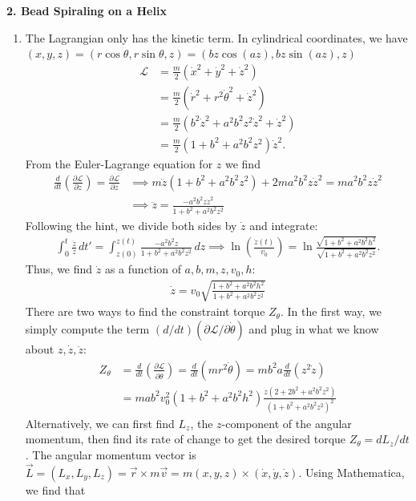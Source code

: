 \documentclass{article}
\theoremstyle{definition}
\newcommand{\p}{\partial}
\newcommand{\lag}{\mathcal{L}}
\newcommand{\f}[2]{\frac{#1}{#2}}
\newcommand{\lp}{\left(}
\newcommand{\rp}{\right)}
\begin{document}
	
\noindent \textbf{2. Bead Spiraling on a Helix}
\begin{enumerate}[label = (\alph*)]
	\item The Lagrangian only has the kinetic term. In cylindrical coordinates, we have  $(x,y,z) = (r\cos\theta,r\sin\theta,z) = (bz\cos(az), bz \sin(az), z )$
	\begin{align*}
	\lag &= \f{m}{2}(\dot{x}^2 + \dot{y}^2 + \dot{z}^2)\\
	&= \f{m}{2}( \dot{r}^2 + r^2\dot{\theta}^2 +  \dot{z}^2)\\
	&= \f{m}{2}(b^2 \dot{z}^2 + a^2b^2 z^2 \dot{z}^2 + \dot{z}^2)\\
	&= \f{m}{2}(1+b^2+a^2b^2 z^2)\dot{z}^2.
	\end{align*}
	From the Euler-Lagrange equation for $z$ we find 
	\begin{align*}
	\f{d}{dt}\lp \f{\p \lag}{\p \dot{z}} \rp = \f{\p \lag}{\p z} 
	&\implies  m\ddot{z}(1+b^2 + a^2b^2 z^2) + 2ma^2b^2 z\dot{z}^2 = ma^2b^2z\dot{z}^2\\
	&\implies {\ddot{z} = \f{-a^2b^2 z\dot{z}^2}{1+b^2+a^2b^2 z^2}}
	\end{align*}
	Following the hint, we divide both sides by $\dot{z}$ and integrate:
	\begin{align*}
	\int_{0}^t \f{\ddot{z}}{\dot{z}}\,dt' = \int_{z(0)}^{z(t)}	\f{-a^2b^2 z}{1+b^2+a^2b^2 z^2}\,dz
	\implies  \ln \lp \f{\dot{z}(t)}{v_0} \rp = \ln \f{\sqrt{1+b^2+a^2b^2 h^2}}{\sqrt{1+b^2+a^2b^2 z^2}}.
	\end{align*}
	Thus, we find $\dot{z}$ as a function of $a,b,m,z,v_0,h$:
	\begin{align*}
	\boxed{\dot{z} = v_0 \sqrt{\f{1+b^2+a^2b^2h^2}{1+b^2+a^2b^2z^2}}}
	\end{align*}
	There are two ways to find the constraint torque $Z_\theta$. In the first way, we simply compute the term $(d/dt)(\p \lag/\p \dot{\theta})$ and plug in what we know about $z,\dot{z},\ddot{z}$:
	\begin{align*}
	Z_\theta &= \f{d}{dt} \lp \f{\p \lag}{\p \dot{\theta}} \rp =  \f{d}{dt}\lp mr^2\dot\theta \rp  = mb^2 a \f{d}{dt}\lp z^2\dot{z} \rp \\
	&= \boxed{mab^2 v_0^2 (1+b^2+a^2b^2h^2) \f{z(2+2b^2 +a^2b^2 z^2)}{(1+b^2 + a^2b^2 z^2)^2}}
	\end{align*}
	Alternatively, we can first find $L_z$, the $z$-component of the angular momentum, then find its rate of change to get the desired torque $Z_\theta = dL_z/dt$. The angular momentum vector is $\vec{L} = (L_x,L_y,L_z) = \vec{r}\times m\vec{v} = m(x,y,z)\times (\dot x,\dot y, \dot z)$. Using Mathematica, we find that 

\end{enumerate}
\end{document}
